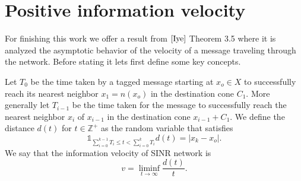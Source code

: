 \section{Positive information velocity }
For finishing this work we offer a result from $\cite{Iye}$ Theorem 3.5 where it is analyzed the asymptotic behavior of the velocity of a message traveling through the network. Before stating it lets first define some key concepts.
\begin{defn}
Let $T_0$ be the time taken by a tagged message starting at $x_o\in X$ to successfully reach its nearest neighbor $x_1=n(x_o)$ in the destination cone $C_1$. More generally let $T_{i-1}$ be the time taken for the message to successfully reach the nearest neighbor $x_i$ of $x_{i-1}$ in the destination cone $x_{i-1}+C_1$. We define the distance $d(t)$ for $t\in\mathbb{Z}^+$ as the random variable that satisfies $$\mathds{1}_{\sum_{i=0}^{k-1}T_i\leq t<\sum_{i=0}^k T_i }d(t)=\vert x_k-{x_o}\vert.$$ We say that the information velocity of SINR network is $$v=\liminf_{t\rightarrow\infty}\frac{d(t)}{t}.$$
\end{defn}


